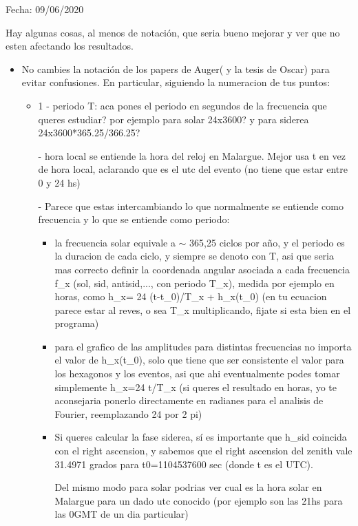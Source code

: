 Fecha: 09/06/2020

Hay algunas cosas, al menos de notación, que  seria bueno mejorar y ver que no esten afectando los resultados.

\begin{itemize}
	\item No cambies la notación de los papers de Auger( y la tesis de Oscar) para evitar confusiones. En particular, siguiendo la numeracion de tus puntos:

	\begin{itemize}
		\item 1 - periodo T: aca pones el periodo en segundos de la frecuencia que queres estudiar? por ejemplo para solar 24x3600? y para siderea 24x3600*365.25/366.25?

		 - hora local se entiende la hora del reloj en Malargue. Mejor usa t en vez de hora local, aclarando que es el utc del evento (no tiene que estar entre 0 y 24 hs)

		\done - Parece que estas intercambiando lo que normalmente se entiende como frecuencia y lo que se entiende como periodo:

			\begin{itemize}

				\item la frecuencia solar equivale a $\sim$ 365,25 ciclos por año, y el periodo es la duracion de cada ciclo, y siempre se denoto con T, asi que seria mas correcto definir la coordenada angular asociada a cada frecuencia f\_x (sol, sid, antisid,..., con periodo T\_x), medida por ejemplo en horas,  como h\_x= 24 (t-t\_0)/T\_x + h\_x(t\_0)  (en tu ecuacion parece estar al reves, o sea T\_x multiplicando, fijate si esta bien en el programa)

				\item para el grafico de las amplitudes para distintas frecuencias no importa el valor de h\_x(t\_0), solo que tiene que ser consistente el valor para los hexagonos y los eventos, asi que ahi eventualmente podes tomar simplemente h\_x=24  t/T\_x  (si queres el resultado en horas, yo te aconsejaria ponerlo directamente en radianes para el analisis de Fourier, reemplazando 24 por 2 pi)

				\item Si queres calcular la fase siderea, sí es importante que h\_sid coincida con el right ascension, y sabemos que el right ascension del zenith vale  31.4971 grados para t0=1104537600 sec  (donde t es el UTC).

				\done Del mismo modo para solar podrias ver cual es la hora solar en Malargue para un dado utc conocido (por ejemplo son las 21hs para las 0GMT de un dia particular)


\end{itemize}
\end{itemize}
\end{itemize}
